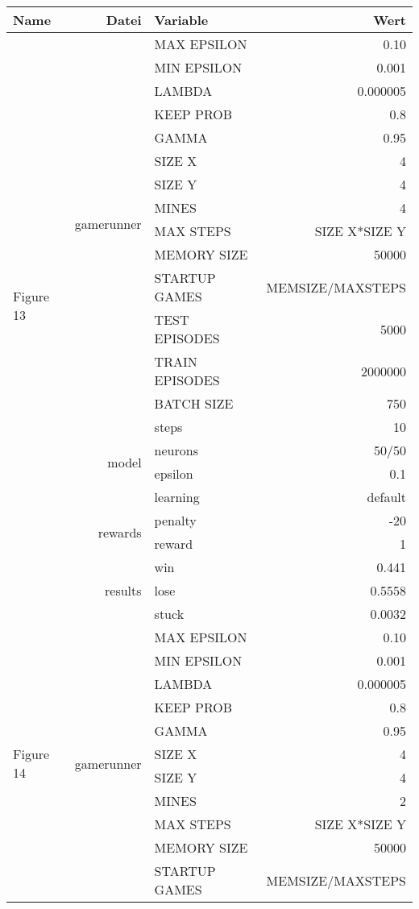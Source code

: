 \documentclass[9pt]{article}
\begin{document}
\begin{tabularx}{\textwidth}{l|r|X|r}
	Name & Datei & Variable & Wert \\
	\hline
	\multirow{21}{*}{Figure 13} & \multirow{14}{*}{gamerunner} & MAX EPSILON	& 0.10\\
	& & MIN EPSILON	& 0.001 \\
	& & LAMBDA & 0.000005 \\
	& & KEEP PROB & 0.8 \\
	& & GAMMA	& 0.95 \\
	& & SIZE X & 4 \\
	& & SIZE Y & 4 \\
	& & MINES & 4 \\
	& & MAX STEPS & SIZE X*SIZE Y\\
	& & MEMORY SIZE & 50000 \\
	& & STARTUP GAMES & MEMSIZE/MAXSTEPS \\
	& & TEST EPISODES & 5000 \\
	& & TRAIN EPISODES & 2000000 \\
	& & BATCH SIZE & 750 \\
	& & steps & 10\\\cline{2-4}
	& \multirow{2}{*}{model} & neurons & 50/50 \\ 
	& & epsilon & 0.1\\
	& & learning & default \\\cline{2-4}
	& \multirow{2}{*}{rewards} & penalty & -20\\
	& & reward & 1\\\cline{2-4}
	& \multirow{3}{*}{results} & win & 0.441\\
	& & lose & 0.5558\\
	& & stuck & 0.0032\\
	\hline
	\hline
	\multirow{21}{*}{Figure 14} & \multirow{14}{*}{gamerunner} & MAX EPSILON	& 0.10\\
	& & MIN EPSILON	& 0.001 \\
	& & LAMBDA & 0.000005 \\
	& & KEEP PROB & 0.8 \\
	& & GAMMA	& 0.95 \\
	& & SIZE X & 4 \\
	& & SIZE Y & 4 \\
	& & MINES & 2 \\
	& & MAX STEPS & SIZE X*SIZE Y\\
	& & MEMORY SIZE & 50000 \\
	& & STARTUP GAMES & MEMSIZE/MAXSTEPS \\

\end{tabularx}
\end{document}
